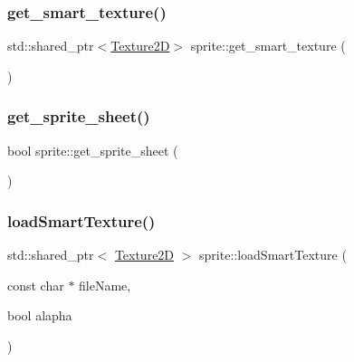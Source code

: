 \mbox{\label{classsprite_a85a220f38cdb533f79f888d2b5911e4c}} 
\subsubsection{\texorpdfstring{get\+\_\+smart\+\_\+texture()}{get\_smart\_texture()}}
{\footnotesize\ttfamily std\+::shared\+\_\+ptr$<$\hyperlink{classTexture2D}{Texture2D}$>$ sprite\+::get\+\_\+smart\+\_\+texture (\begin{DoxyParamCaption}{ }\end{DoxyParamCaption})\hspace{0.3cm}{\ttfamily [inline]}}

\mbox{\label{classsprite_a6b2f3ae0858b040330d66a547543d91e}} 
\subsubsection{\texorpdfstring{get\+\_\+sprite\+\_\+sheet()}{get\_sprite\_sheet()}}
{\footnotesize\ttfamily bool sprite\+::get\+\_\+sprite\+\_\+sheet (\begin{DoxyParamCaption}{ }\end{DoxyParamCaption})\hspace{0.3cm}{\ttfamily [inline]}}

\mbox{\label{classsprite_afe48450fff6269737f6adf370d03bbd8}} 
\subsubsection{\texorpdfstring{load\+Smart\+Texture()}{loadSmartTexture()}}
{\footnotesize\ttfamily std\+::shared\+\_\+ptr$<$ \hyperlink{classTexture2D}{Texture2D} $>$ sprite\+::load\+Smart\+Texture (\begin{DoxyParamCaption}\item[{const char $\ast$}]{file\+Name,  }\item[{bool}]{alapha }\end{DoxyParamCaption})}

